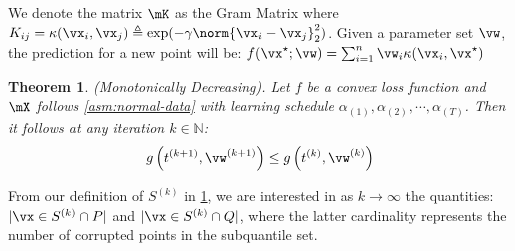 \documentclass{article} %
\theoremstyle{plain}
\newtheorem{thm}{Theorem}
\theoremstyle{definition}
\theoremstyle{remark}
\newcommand{\ccref}[1]{\textcolor{black}{\cref{#1}}}
\begin{document}
We denote the matrix $\mK$ as the Gram Matrix where $ K_{ij} = \kappa(\vx_i,\vx_j) \triangleq \exp(-\gamma\norm{\vx_i-\vx_j}_2^2)$. Given a parameter set $\vw$, the prediction for a new point will be: $ f(\vx^{\star};\vw) = \sum_{i=1}^n \vw_i \kappa(\vx_i,\vx^{\star})$\\
	
	\begin{thm}
		\label{thm:monotonically-decreasing}
		(Monotonically Decreasing). Let $f$ be a convex loss function and $\mX$ follows \ccref{asm:normal-data} with learning schedule $\alpha_{(1)},\alpha_{(2)},\cdots,\alpha_{(T)}$. Then it follows at any iteration $k \in \mathbb{N}$:
		\begin{equation}
			g\left(t^{(k+1)},\vw^{(k+1)}\right) \leq g\left(t^{(k)},\vw^{(k)}\right)
		\end{equation}
	\end{thm}
	
	From our definition of $S^{(k)}$ in \ccref{thm:monotonically-decreasing}, we are interested in as $k \to \infty$ the quantities: $|\vx \in S^{(k)} \cap P|$ and $|\vx \in S^{(k)} \cap Q|$, where the latter cardinality represents the number of corrupted points in the subquantile set.
\end{document}
